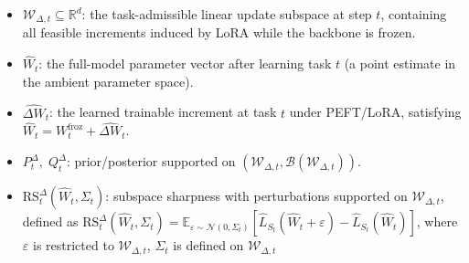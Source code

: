 \documentclass{article}
\theoremstyle{plain}
\theoremstyle{definition}
\theoremstyle{remark}
\begin{document}
\begin{itemize}


\item $\mathcal W_{\Delta,t}\subseteq\mathbb R^d$: the task-admissible linear update subspace at step $t$, containing all feasible increments induced by LoRA while the backbone is frozen.


\item $\widehat W_t$: the full-model parameter vector after learning task $t$ (a point estimate in the ambient parameter space).
\item $\widehat{\Delta W}_t$: the learned trainable increment at task $t$ under PEFT/LoRA, satisfying $\widehat W_t = W_t^{\mathrm{froz}} + \widehat{\Delta W}_t$.

 


 
\item $P_t^\Delta,\;Q_t^\Delta$: prior/posterior supported on $(\mathcal W_{\Delta,t},\mathcal B(\mathcal W_{\Delta,t}))$.




\item $\mathrm{RS}_t^\Delta(\widehat W_t,\Sigma_t)$: subspace sharpness with perturbations supported on $\mathcal W_{\Delta,t}$, defined as
$\mathrm{RS}_t^\Delta(\widehat W_t,\Sigma_t)=\mathbb E_{\varepsilon\sim\mathcal N(0,\Sigma_t)}[\hat L_{S_t}(\widehat W_t+\varepsilon)-\hat L_{S_t}(\widehat W_t)]$,
where $\varepsilon$ is restricted to $\mathcal W_{\Delta,t}$, $\Sigma_t$ is defined on $\mathcal{W}_{\Delta,t}$



\end{itemize}
\end{document}
